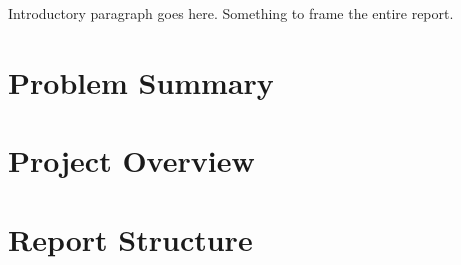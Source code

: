

Introductory paragraph goes here. Something to frame the entire report.

\section{Problem Summary}

\section{Project Overview}
    

\section{Report Structure}



\newpage
